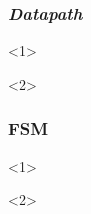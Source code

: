 \documentclass{beamer}
\begin{document}
    \begin{frame}
        \frametitle{\textit{Datapath}}
        \begin{onlyenv}<1>
            \begin{figure}[h]
                \centering
            \end{figure}
        \end{onlyenv}

        \begin{onlyenv}<2>
          \begin{figure}[h]
            \centering
          \end{figure}
        \end{onlyenv}
    \end{frame}

    \begin{frame}
        \frametitle{FSM}
        \begin{onlyenv}<1>
            \begin{figure}[h]
                \centering
            \end{figure}
        \end{onlyenv}

        \begin{onlyenv}<2>
          \begin{figure}[h]
            \centering
          \end{figure}
        \end{onlyenv}
    \end{frame}
\end{document}
